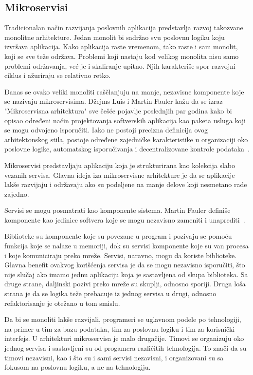 \subsection{Mikroservisi}\label{sec:arhitektura-mikroservisi}

Tradicionalan način razvijanja poslovnih aplikacija predstavlja razvoj takozvane monolitne arhitekture. 
Jedan monolit bi sadržao svu poslovnu logiku koju izvršava aplikacija. Kako aplikacija raste vremenom, 
tako raste i sam monolit, koji se sve teže održava. Problemi koji nastaju kod velikog monolita nisu 
samo problemi održavanja, već je i skaliranje upitno. Njih karakteriše spor razvojni ciklus i ažuriraju se relativno retko.

Danas se ovako veliki monoliti raščlanjuju na manje, nezavisne komponente koje se nazivaju mikroservisima.
Džejms Luis i Martin Fauler kažu da se izraz "Mikroservisna arhitektura" sve češće pojavlje poslednjih 
par godina kako bi opisao određeni način projektovanja softverskih aplikacija kao paketa usluga koji se 
mogu odvojeno isporučiti. Iako ne postoji precizna definicija ovog arhitektonskog stila, postoje određene 
zajedničke karakteristike u organizaciji oko poslovne logike, automatskog isporučivanja i decentralizovane 
kontrole podataka~\cite{martinfowler_microservices}.

Mikroservisi predstavljaju aplikaciju koja je strukturirana kao kolekcija slabo vezanih servisa. Glavna 
ideja iza mikroservisne arhitekture je da se aplikacije lakše razvijaju i održavaju ako su podeljene 
na manje delove koji nesmetano rade zajedno.

Servisi se mogu posmatrati kao komponente sistema. Martin Fauler definiše komponente kao jedinice 
softvera koje se mogu nezavisno zameniti i unaprediti~\cite{martinfowler_software_component}.

Biblioteke su komponente koje su povezane u program i pozivaju se pomoću funkcija koje se nalaze u 
memoriji, dok su servisi komponente koje su van procesa i koje komuniciraju preko mreže.
Servisi, naravno, mogu da koriste biblioteke. Glavna benefit ovakvog korišćenja servisa je da se mogu 
nezavisno isporučiti, što nije slučaj ako imamo jednu aplikaciju koja je sastavljena od skupa biblioteka.
Sa druge strane, daljinski pozivi preko mreže su skuplji, odnosno sporiji. 
Druga loša strana je da se logika teže prebacuje iz jednog servisa u drugi, odnosno refaktorisanje je 
otežano u tom smislu.

Da bi se monoliti lakše razvijali, programeri se uglavnom podele po tehnologiji, na primer u tim za 
bazu podataka, tim za poslovnu logiku i tim za korisnički interfejs. U arhitekturi mikroservisa je malo 
drugačije. Timovi se organizuju oko jednog servisa i sastavljeni su od progamera različitih tehnologija.
To znači da su timovi nezavisni, kao i što su i sami servisi nezavisni, i organizovani su sa fokusom na 
poslovnu logiku, a ne na tehnologiju.

